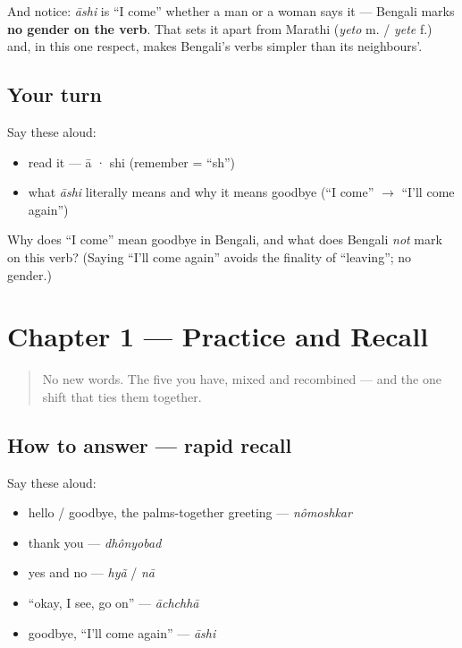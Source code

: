 \begin{culture}
And notice: \emph{āshi} is \textquotedblleft{}I come\textquotedblright{} whether a man or a woman says it — Bengali marks \textbf{no gender on the verb}. That sets it apart from Marathi (\emph{yeto} m. / \emph{yete} f.) and, in this one respect, makes Bengali's verbs simpler than its neighbours'.
\end{culture}

\subsection*{Your turn}
Say these aloud:

\begin{itemize}
\raggedright
  \item read it — ā · shi (remember  = \textquotedblleft{}sh\textquotedblright{})
  \item what \emph{āshi} literally means and why it means goodbye (\textquotedblleft{}I come\textquotedblright{} $\to$ \textquotedblleft{}I'll come again\textquotedblright{})
\end{itemize}

\begin{tcolorbox}[breakable,colback=teal!4,colframe=teal!35!black,title={Before you move on}]
Why does \textquotedblleft{}I come\textquotedblright{} mean goodbye in Bengali, and what does Bengali \emph{not} mark on this verb? (Saying \textquotedblleft{}I'll come again\textquotedblright{} avoids the finality of \textquotedblleft{}leaving\textquotedblright{}; no gender.)
\end{tcolorbox}
\section[Practice]{Chapter 1 — Practice and Recall}

\label{lesson:BN-C01-practice}



\begin{quote}
No new words. The five you have, mixed and recombined — and the one shift that ties them together.
\end{quote}

\subsection*{How to answer — rapid recall}
Say these aloud:

\begin{itemize}
\raggedright
  \item hello / goodbye, the palms-together greeting — \emph{nômoshkar}
  \item thank you — \emph{dhônyobad}
  \item yes and no — \emph{hyã} / \emph{nā}
  \item \textquotedblleft{}okay, I see, go on\textquotedblright{} — \emph{āchchhā}
  \item goodbye, \textquotedblleft{}I'll come again\textquotedblright{} — \emph{āshi}
\end{itemize}

